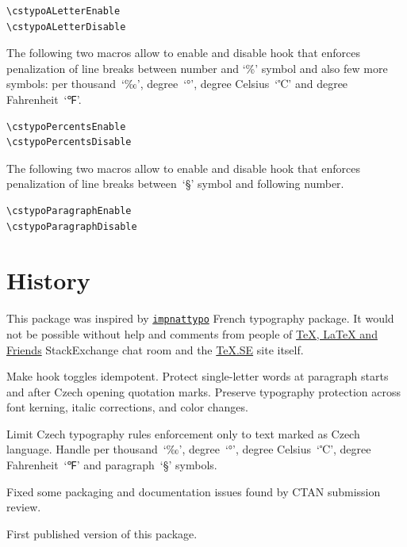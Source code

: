 \documentclass[paper=B5,DIV=calc,parskip=half]{scrartcl}
\begin{document}
\begin{lstlisting}[style=myLatexStyle]
\cstypoALetterEnable
\cstypoALetterDisable
\end{lstlisting}

The following two macros allow to enable and disable hook that enforces
penalization of line breaks between number and \enquote*{\%} symbol and also
few more symbols: per thousand~\enquote*{‰}, degree~\enquote*{°}, degree
Celsius~\enquote*{℃} and degree Fahrenheit~\enquote*{℉}.

\begin{lstlisting}[style=myLatexStyle]
\cstypoPercentsEnable
\cstypoPercentsDisable
\end{lstlisting}

The following two macros allow to enable and disable hook that enforces
penalization of line breaks between~\enquote*{§} symbol and following number.

\begin{lstlisting}[style=myLatexStyle]
\cstypoParagraphEnable
\cstypoParagraphDisable
\end{lstlisting}


\section{History}

This package was inspired by
\texttt{\href{http://www.ctan.org/pkg/impnattypo}{impnattypo}} French
typography package. It would not be possible without help and comments from
people of
\href{http://chat.stackexchange.com/rooms/41/tex-latex-and-friends}{\TeX{},
  \LaTeX{} and Friends} StackExchange chat room and the
\href{http://tex.stackexchange.com/}{\TeX.SE} site itself.

\begin{description}[style=nextline, labelwidth=4.5em, leftmargin=!, labelindent=0em]
\item[\texttt{v0.04}] Make hook toggles idempotent. Protect single-letter
  words at paragraph starts and after Czech opening quotation marks.
  Preserve typography protection across font kerning, italic corrections,
  and color changes.
\item[\texttt{v0.03}] Limit Czech typography rules enforcement only to text
  marked as Czech language. Handle per thousand~\enquote*{‰},
  degree~\enquote*{°}, degree Celsius~\enquote*{℃}, degree
  Fahrenheit~\enquote*{℉} and paragraph~\enquote*{§} symbols.
\item[\texttt{v0.02}] Fixed some packaging and documentation issues found by
  CTAN submission review.
\item[\texttt{v0.01}] First published version of this package.
\end{description}
\end{document}
